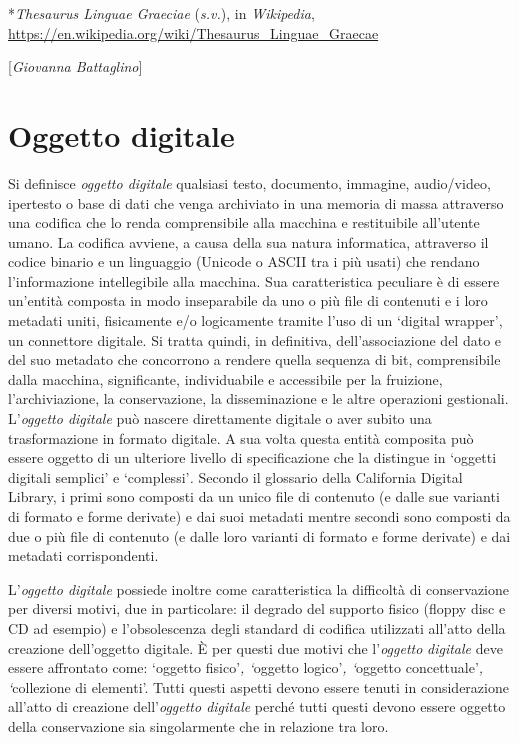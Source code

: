 {{*\emph{Thesaurus Linguae Graeciae} (\emph{s.v.}), in \emph{Wikipedia},
\url{https://en.wikipedia.org/wiki/Thesaurus_Linguae_Graecae}

}

\hrulefill 

{[}\emph{Giovanna Battaglino}{]}

\chapter{Oggetto digitale}

Si definisce \emph{oggetto digitale} qualsiasi testo, documento,
immagine, audio/video, ipertesto o base di dati che venga archiviato in
una memoria di massa attraverso una codifica che lo renda comprensibile
alla macchina e restituibile all'utente umano. La codifica avviene, a
causa della sua natura informatica, attraverso il codice binario e un
linguaggio (Unicode o ASCII tra i più usati) che rendano l'informazione
intellegibile alla macchina. Sua caratteristica peculiare è di essere
un'entità composta in modo inseparabile da uno o più file di contenuti e
i loro metadati uniti, fisicamente e/o logicamente tramite l'uso di un
`digital wrapper', un connettore digitale. Si tratta quindi, in
definitiva, dell'associazione del dato e del suo metadato che concorrono
a rendere quella sequenza di bit, comprensibile dalla macchina,
significante, individuabile e accessibile per la fruizione,
l'archiviazione, la conservazione, la disseminazione e le altre
operazioni gestionali. L'\emph{oggetto digitale} può nascere
direttamente digitale o aver subito una trasformazione in formato
digitale. A sua volta questa entità composita può essere oggetto di un
ulteriore livello di specificazione che la distingue in `oggetti
digitali semplici' e `complessi'\emph{.} Secondo il glossario della
California Digital Library, i primi sono composti da un unico file di
contenuto (e dalle sue varianti di formato e forme derivate) e dai suoi
metadati mentre secondi sono composti da due o più file di contenuto (e
dalle loro varianti di formato e forme derivate) e dai metadati
corrispondenti.

L'\emph{oggetto digitale} possiede inoltre come caratteristica la
difficoltà di conservazione per diversi motivi, due in particolare: il
degrado del supporto fisico (floppy disc e CD ad esempio) e
l'obsolescenza degli standard di codifica utilizzati all'atto della
creazione dell'oggetto digitale. È per questi due motivi che
l'\emph{oggetto} \emph{digitale} deve essere affrontato come: `oggetto
fisico'\emph{, `}oggetto logico'\emph{, `}oggetto concettuale'\emph{,
`}collezione di elementi'. Tutti questi aspetti devono essere tenuti in
considerazione all'atto di creazione dell'\emph{oggetto digitale} perché
tutti questi devono essere oggetto della conservazione sia singolarmente
che in relazione tra loro.

}
